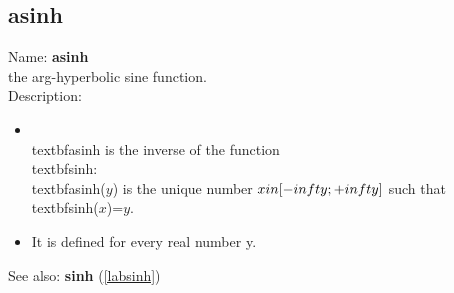 \subsection{asinh}
\label{labasinh}
\noindent Name: \textbf{asinh}\\
the arg-hyperbolic sine function.\\
\noindent Description: \begin{itemize}

\item \\textbf{asinh} is the inverse of the function \\textbf{sinh}: \\textbf{asinh}($y$) is the unique number \n   $x \\in [-\\infty; +\\infty]$ such that \\textbf{sinh}($x$)=$y$.\n
\item It is defined for every real number y.\n\end{itemize}
See also: \textbf{sinh} (\ref{labsinh})
